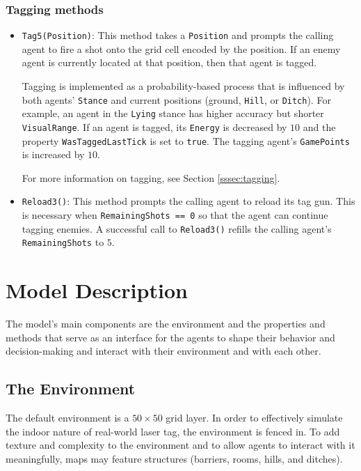 \documentclass[
  a4paper,
  english,
  DIV=16,
  11pt,
  parskip=half,
  dvipsnames,
  listof=totoc,		     %
  index=totoc,		     %
  bibliography=totoc,	 %
]{scrartcl}
\begin{document}
\subsubsection{Tagging methods} \label{sssec:tagMeth}
\begin{itemize}
  \item \texttt{Tag5(Position)}: This method takes a \texttt{Position} and prompts the calling agent to fire a shot onto the grid cell encoded by the position. If an enemy agent is currently located at that position, then that agent is tagged.
  
  Tagging is implemented as a probability-based process that is influenced by both agents' \texttt{Stance} and current positions (ground, \texttt{Hill}, or \texttt{Ditch}). For example, an agent in the \texttt{Lying} stance has higher accuracy but shorter \texttt{VisualRange}. If an agent is tagged, its \texttt{Energy} is decreased by $10$ and the property \texttt{WasTaggedLastTick} is set to \texttt{true}. The tagging agent's \texttt{GamePoints} is increased by $10$.
  
  For more information on tagging, see Section \ref{sssec:tagging}.
  \item \texttt{Reload3()}: This method prompts the calling agent to reload its tag gun. This is necessary when \texttt{RemainingShots == 0} so that the agent can continue tagging enemies. A successful call to \texttt{Reload3()} refills the calling agent's \texttt{RemainingShots} to $5$.
\end{itemize}
%
%
\section{Model Description} \label{sec:modelDesc}
The model's main components are the environment and the properties and methods that serve as an interface for the agents to shape their behavior and decision-making and interact with their environment and with each other.
%
\subsection{The Environment} \label{ssec:env}
The default environment is a $50\times 50$ grid layer. In order to effectively simulate the indoor nature of real-world laser tag, the environment is fenced in. To add texture and complexity to the environment and to allow agents to interact with it meaningfully, maps may feature structures (barriers, rooms, hills, and ditches).
\end{document}
